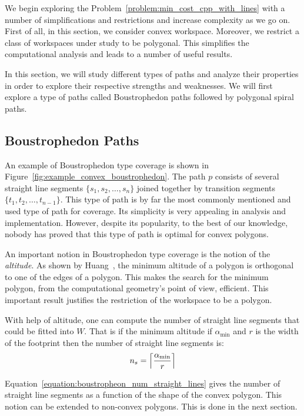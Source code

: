 \documentclass[../main.tex]{subfiles}
\begin{document}
We begin exploring the Problem~\ref{problem:min_cost_cpp_with_lines} with a number of simplifications and restrictions and increase complexity as we go on. First of all, in this section, we consider convex workspace. Moreover, we restrict a class of workspaces under study to be polygonal. This simplifies the computational analysis and leads to a number of useful results.

In this section, we will study different types of paths and analyze their properties in order to explore their respective strengths and weaknesses. We will first explore a type of paths called Boustrophedon paths followed by polygonal spiral paths.

\subsection{Boustrophedon Paths}
\label{sec:convex_cpp_with_lines__boustrophedon}
An example of Boustrophedon type coverage is shown in Figure~\ref{fig:example_convex_boustrophedon}. The path $p$ consists of several straight line segments $\{s_1,s_2,
\dots,s_n\}$ joined together by transition segments $\{t_1,t_2,\dots,t_{n-1}\}$. This type of path is by far the most commonly mentioned and used type of path for coverage. Its simplicity is very appealing in analysis and implementation. However, despite its popularity, to the best of our knowledge, nobody has proved that this type of path is optimal for convex polygons.

An important notion in Boustrophedon type coverage is the notion of the \emph{altitude}. As shown by Huang~\cite{Huang2001optimal}, the minimum altitude of a polygon is orthogonal to one of the edges of a polygon. This makes the search for the minimum polygon, from the computational geometry's point of view, efficient. This important result justifies the restriction of the workspace to be a polygon.

With help of altitude, one can compute the number of straight line segments that could be fitted into $W$. That is if the minimum altitude if $\alpha_{\min}$ and $r$ is the width of the footprint then the number of straight line segments is:
\begin{equation}
\label{equation:boustropheon_num_straight_lines}
\begin{aligned}
	n_s=\ceil*{\frac{\alpha_{\min}}{r}}
\end{aligned}
\end{equation}

Equation~\ref{equation:boustropheon_num_straight_lines} gives the number of straight line segments as a function of the shape of the convex polygon. This notion can be extended to non-convex polygons. This is done in the next section.
\end{document}

